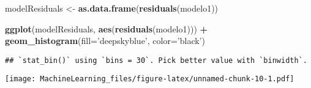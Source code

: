 \documentclass[
]{article}
\newenvironment{Shaded}{\begin{snugshade}}{\end{snugshade}}
\newcommand{\DataTypeTok}[1]{\textcolor[rgb]{0.13,0.29,0.53}{#1}}
\newcommand{\KeywordTok}[1]{\textcolor[rgb]{0.13,0.29,0.53}{\textbf{#1}}}
\newcommand{\NormalTok}[1]{#1}
\newcommand{\OperatorTok}[1]{\textcolor[rgb]{0.81,0.36,0.00}{\textbf{#1}}}
\newcommand{\StringTok}[1]{\textcolor[rgb]{0.31,0.60,0.02}{#1}}
\begin{document}
\begin{Shaded}
\begin{Highlighting}[]
\NormalTok{modelResiduals <-}\StringTok{ }\KeywordTok{as.data.frame}\NormalTok{(}\KeywordTok{residuals}\NormalTok{(modelo1))}

\KeywordTok{ggplot}\NormalTok{(modelResiduals, }\KeywordTok{aes}\NormalTok{(}\KeywordTok{residuals}\NormalTok{(modelo1))) }\OperatorTok{+}
\StringTok{  }\KeywordTok{geom_histogram}\NormalTok{(}\DataTypeTok{fill=}\StringTok{'deepskyblue'}\NormalTok{, }\DataTypeTok{color=}\StringTok{'black'}\NormalTok{)}
\end{Highlighting}
\end{Shaded}

\begin{verbatim}
## `stat_bin()` using `bins = 30`. Pick better value with `binwidth`.
\end{verbatim}

\texttt{[image: MachineLearning\_files/figure-latex/unnamed-chunk-10-1.pdf]}

\begin{Shaded}
\end{Shaded}
\end{document}
